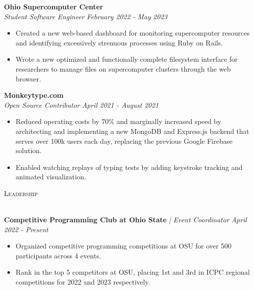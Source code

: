 \documentclass[letterpaper]{article}
\newcommand{\lineunder} {
    \vspace*{-8pt} \\
    \hspace*{-18pt} \hrulefill \\
}
\newcommand{\header} [1] {
    {\hspace*{-18pt}\vspace*{6pt} \textsc{#1}}
    \vspace*{-6pt} \lineunder
}
\begin{document}
    \textbf{Ohio Supercomputer Center}\\
    
    \textit{Student Software Engineer} \hfill \textsl{February 2022 - May 2023}\\
    \vspace{-7pt}
    \begin{itemize} \itemsep -1mm
        
            \item Created a new web-based dashboard for monitoring supercomputer resources and identifying excessively strenuous processes using Ruby on Rails.

            \item Wrote a new optimized and functionally complete filesystem interface for researchers to manage files on supercomputer clusters through the web browser.

    \end{itemize}
    \vspace{-2mm}

    	\textbf{Monkeytype.com}\\
    
    \textit{Open Source Contributor} \hfill \textsl{April 2021 - August 2021}\\
    \vspace{-7pt}
    \begin{itemize} \itemsep -1mm
            \item Reduced operating costs by 70\% and marginally increased speed by architecting and implementing a new MongoDB and Express.js backend that serves over 100k users each day, replacing the previous Google Firebase solution.

            \item Enabled watching replays of typing tests by adding keystroke tracking and animated visualization.

    \end{itemize}
    \vspace{-2mm}

\header{Leadership}
\vspace{1mm}

    \textbf{Competitive Programming Club at Ohio State} \textit{| Event Coordinator} \hfill \textsl{April 2022 - Present}\\
    \vspace{-2mm}
    \begin{itemize} \itemsep -1mm
    
        \item Organized competitive programming competitions at OSU for over 500 participants across 4 events.
    
        \item Rank in the top 5 competitors at OSU, placing 1st and 3rd in ICPC regional competitions for 2022 and 2023 respectively.
    
    \end{itemize}
    \vspace{-1mm}
\end{document}
